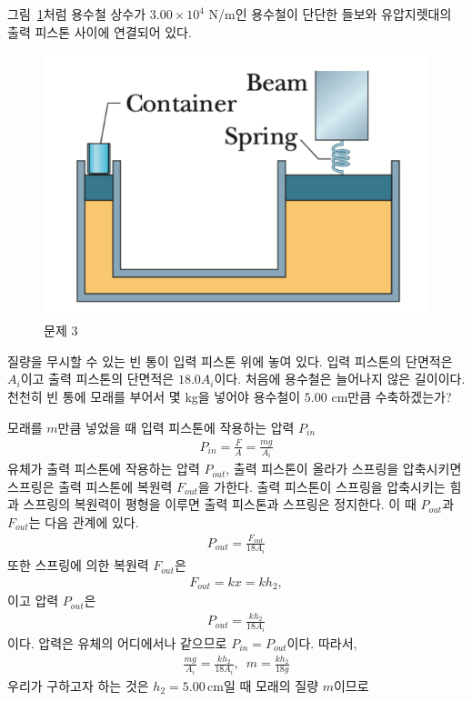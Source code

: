 \documentclass[floatfix,nofootinbib,superscriptaddress,fleqn]{revtex4-2}
\begin{document}
\vspace{1.cm}


그림~\ref{fig:2}처럼 용수철 상수가 $3.00\times 10^4$ N/m인 용수철이
단단한 들보와 유압지렛대의 출력 피스톤 사이에 연결되어 있다.
\begin{figure}[htp]
  \centering
  \includegraphics[scale=0.65]{Qfig16-2.pdf}
    \caption{문제 3}
  \label{fig:2}
\end{figure}
 질량을 무시할 수 있는 빈 통이 입력 피스톤 위에 놓여 있다. 입력 피스톤의
단면적은 $A_i$이고 출력 피스톤의 단면적은 $18.0 A_i$이다. 처음에
용수철은 늘어나지 않은 길이이다. 천천히 빈 통에 모래를 부어서 몇 kg을
넣어야 용수철이 $5.00$ cm만큼 수축하겠는가? 

모래를 $m$만큼 넣었을 때 입력 피스톤에 작용하는 압력 $P_{in}$
 \begin{align}
   P_{in} =\frac{F}{A} =\frac{mg}{A_i}
 \end{align}
 유체가 출력 피스톤에 작용하는 압력 $P_{out}$, 출력 피스톤이 올라가 스프링을 압축시키면 
 스프링은 출력 피스톤에 복원력 $F_{out}$을 가한다. 출력 피스톤이 스프링을 압축시키는 힘과
 스프링의 복원력이 평형을 이루면 출력 피스톤과 스프링은 정지한다. 
 이 때 $P_{out}$과 $F_{out}$는 다음 관계에 있다.
 \begin{align}
   P_{out} = \frac{F_{out}}{18A_i}
 \end{align}
 또한 스프링에 의한 복원력 $F_{out}$은
 \begin{align}
   F_{out} = kx = kh_2,
 \end{align}
 이고 압력 $P_{out}$은
 \begin{align}
  P_{out} = \frac{kh_2}{18A_i}
 \end{align}
 이다. 압력은 유체의 어디에서나 같으므로 $P_{in}=P_{out}$이다. 따라서,
 \begin{align}
  \frac{mg}{A_i} = \frac{kh_2}{18A_i},\,\,\,m=\frac{kh_2}{18g}
 \end{align}
 우리가 구하고자 하는 것은 $h_2 = 5.00\,\mathrm{cm}$일 때 모래의 질량 $m$이므로
\vspace{1.cm}
\end{document}
